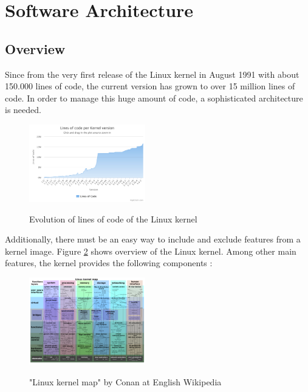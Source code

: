 \documentclass{sig-alternate-05-2015}
\begin{document}
\section{Software Architecture}
\subsection{Overview}
Since from the very first release of the Linux kernel in August 1991 \cite{linuxtimeline} with about 150.000 lines of code, the current version has grown to over 15 million lines of code. In order to manage this huge amount of code, a sophisticated architecture is needed.
\begin{figure}[h]
\centering
\includegraphics[width= 0.45\textwidth ]{img/chart.pdf}
\label{kconfig-compil}
\caption{Evolution of lines of code of the Linux kernel \cite{linuxcounter}}
\end{figure}

Additionally, there must be an easy way to include and exclude features from a kernel image. 
Figure \ref{fig:kernelmap} shows overview of the Linux kernel. Among other main features, the kernel provides the following  components \cite{mauerer2010professional}:
\begin{figure}[h]
\centering
\includegraphics[width= 0.45\textwidth ]{img/Linux_kernel_map.png}
\label{fig:kernelmap}
\caption{"Linux kernel map" by Conan at English Wikipedia \cite{kernelmap}}
\end{figure}
\end{document}

